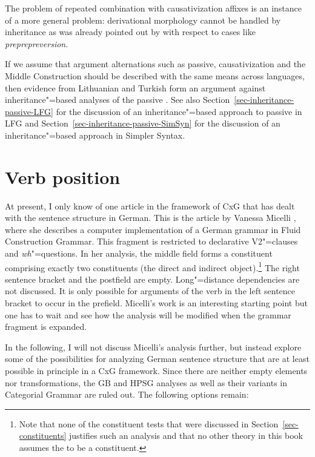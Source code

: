 The problem of repeated combination with causativization affixes is an instance of a more general
problem: derivational morphology cannot be handled by inheritance as was already pointed out by
\citet{KN93a} with respect to cases like \emph{preprepreversion}.

If we assume that argument alternations such as passive, causativization and the Middle Construction should be described with the same means
across languages, then evidence from Lithuanian and Turkish form an argument against
inheritance"=based analyses of the passive \citep{Mueller2006d,Mueller2007d,MWArgSt}. See also
Section~\ref{sec-inheritance-passive-LFG} for the discussion of an inheritance"=based approach to passive in LFG and Section~\ref{sec-inheritance-passive-SimSyn}
for the discussion of an inheritance"=based approach in Simpler Syntax.

\section{Verb position}

At present, I only know of one article in the framework of CxG that has dealt with the sentence structure
in German. This is the article by Vanessa Micelli
\citeyearpar{Micelli2012a}, where she describes a computer implementation of a German grammar in Fluid Construction Grammar\indexfcg.
This fragment is restricted to declarative V2"=clauses and \emph{wh}"=questions. In her analysis, the middle field forms a constituent
comprising exactly two constituents (the direct and indirect object).\footnote{%
  Note that none of the constituent tests that were discussed in Section~\ref{sec-constituents}
  justifies such an analysis and that no other theory in this book assumes the \mf to be a constituent.%
} The right sentence bracket and the postfield are empty.
Long"=distance dependencies are not discussed. It is only possible for arguments of the verb in the left sentence bracket to occur
in the prefield. Micelli's work is an interesting starting point but one has to wait and see how the analysis will be  modified when
the grammar fragment is expanded.

\largerpage
In the following, I will not discuss Micelli's analysis further, but instead explore some of the possibilities for analyzing German sentence
structure that are at least possible in principle in a CxG framework. Since there are neither empty elements nor transformations, the GB and HPSG analyses
as well as their variants in Categorial Grammar are ruled out.
The following options remain:

